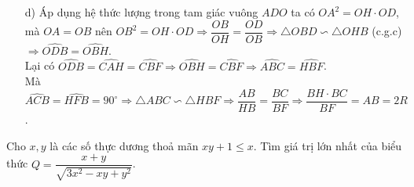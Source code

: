 \begin{ex}
{\begin{enumerate}
			Mà $\widehat{FCB}=\widehat{FAB}$ nên $\widehat{HCF}=\widehat{HCB}+\widehat{FCB}=\widehat{DAH}+\widehat{FAB}=90^\circ$, hay $CH\perp CF$.
			\item[d)] Áp dụng hệ thức lượng trong tam giác vuông $ADO$ ta có $OA^2=OH\cdot OD$, mà $OA=OB$ nên $OB^2=OH\cdot OD \Rightarrow \dfrac{OB}{OH}=\dfrac{OD}{OB}\Rightarrow \triangle OBD\backsim \triangle OHB$ (c.g.c) $\Rightarrow \widehat{ODB}=\widehat{OBH}$.\\
			Lại có $\widehat{ODB}=\widehat{CAH}=\widehat{CBF} \Rightarrow \widehat{OBH}=\widehat{CBF} \Rightarrow \widehat{ABC}=\widehat{HBF}$.\\
			Mà $\widehat{ACB}=\widehat{HFB}=90^\circ \Rightarrow \triangle ABC\backsim \triangle HBF\Rightarrow \dfrac{AB}{HB}=\dfrac{BC}{BF} \Rightarrow \dfrac{BH\cdot BC}{BF}=AB=2R$.
		\end{enumerate}
	}
\end{ex}

\begin{ex}%
	Cho $x,y$ là các số thực dương thoả mãn $xy+1\le x$. Tìm giá trị lớn nhất của biểu thức $Q=\dfrac{x+y}{\sqrt{3x^2-xy+y^2}}$.
\end{ex}
